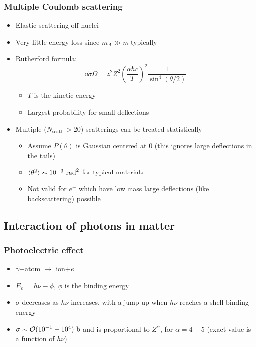 \subsubsection{Multiple Coulomb scattering}
\begin{itemize}
  \item Elastic scattering off nuclei
  \item Very little energy loss since $m_{A} \gg m$ typically
  \item Rutherford formula:
  \begin{equation}
    \dd{\sigma}{\Omega} = z^2Z^2 \left(\frac{\alpha\hbar c}{T}\right)^2 \frac{1}{\sin^4(\theta/2)}
  \end{equation}
  \begin{itemize}
    \item $T$ is the kinetic energy
    \item Largest probability for small deflections
  \end{itemize}
  \item Multiple ($N_\text{scatt.}>20$) scatterings can be treated statistically
  \begin{itemize}
    \item Assume $P(\theta)$ is Gaussian centered at $0$ (this ignores large deflections in the tails)
    \item $\langle \theta^2\rangle \sim 10^{-3}~\text{rad}^2$ for typical materials
    \item Not valid for $e^{\pm}$ which have low mass \thus large deflections (like backscattering) possible
  \end{itemize}
\end{itemize}

\subsection{Interaction of photons in matter}

\subsubsection{Photoelectric effect}
\begin{itemize}
  \item $\gamma$+atom $\rightarrow$ ion+$e^{-}$
  \item $E_e$ = $h\nu - \phi$, $\phi$ is the binding energy
  \item $\sigma$ decreases as $h\nu$ increases, with a jump up when $h\nu$ reaches a shell binding energy
  \item $\sigma\sim \mathcal{O}(10^{-1}-10^{4})~\text{b}$ and is proportional to $Z^\alpha$, for $\alpha=4-5$ (exact value is a function of $h\nu$)
\end{itemize}

